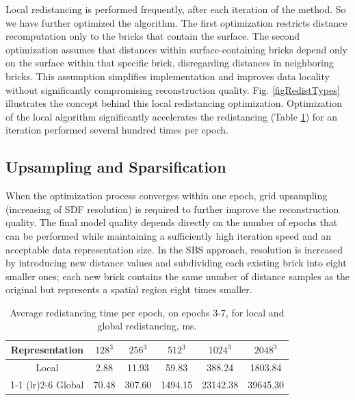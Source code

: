 \documentclass{ieeeaccess}
\begin{document}
Local redistancing is performed frequently, after each iteration of the method. So we have further optimized the algorithm. The first optimization restricts distance recomputation only to the bricks that contain the surface. The second optimization assumes that distances within surface-containing bricks depend only on the surface within that specific brick, disregarding distances in neighboring bricks. This assumption simplifies implementation and improves data locality without significantly compromising reconstruction quality.  Fig. \ref{figRedistTypes} illustrates the concept behind this local redistancing optimization. Optimization of the local algorithm significantly accelerates the redistancing (Table \ref{tabGlobLoc}) for an iteration performed several hundred times per epoch.

\subsection{Upsampling and Sparsification}

When the optimization process converges within one epoch, grid upsampling (increasing of SDF resolution) is required to further improve the reconstruction quality. The final model quality depends directly on the number of epochs that can be performed while maintaining a sufficiently high iteration speed and an acceptable data representation size. In the SBS approach, resolution is increased by introducing new distance values and subdividing each existing brick into eight smaller ones; each new brick contains the same number of distance samples as the original but represents a spatial region eight times smaller. 

\begin{table}
    \centering
    \caption{Average redistancing time per epoch, on epochs 3-7, for local and global redistancing, ms.}
    \begin{tabular}{cccccc}
        \toprule
        Representation & $128^3$ & $256^3$ & $512^3$ & $1024^3$ & $2048^3$  \\
        \midrule[\heavyrulewidth]
        Local  & 2.88 & 11.93 &  59.83 &  388.24 & 1803.84 \\
        \cmidrule(lr){1-1}
        \cmidrule(lr){2-6}
        Global &70.48 &307.60 &1494.15 &23142.38 &39645.30  \\
        \bottomrule
    \end{tabular}
    \label{tabGlobLoc}
\end{table}
\end{document}
